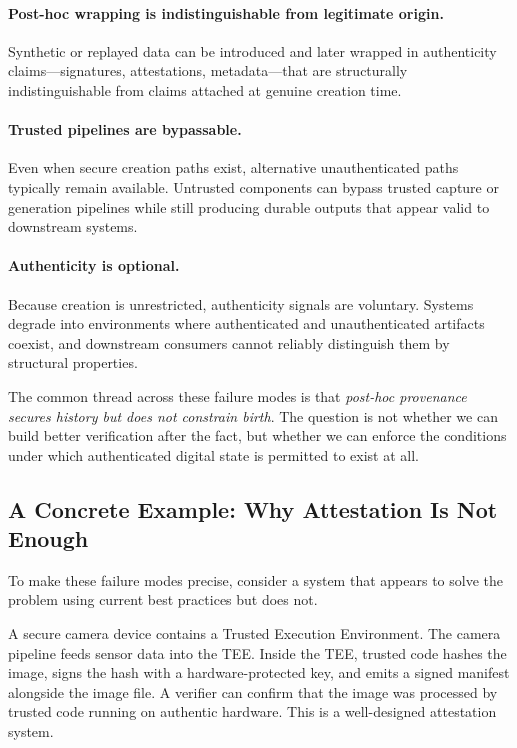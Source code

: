 \documentclass[11pt,letterpaper]{article}
\theoremstyle{occplain}
\theoremstyle{occremark}
\begin{document}
\paragraph{Post-hoc wrapping is indistinguishable from legitimate origin.}
Synthetic or replayed data can be introduced and later wrapped in authenticity claims---signatures, attestations, metadata---that are structurally indistinguishable from claims attached at genuine creation time.

\paragraph{Trusted pipelines are bypassable.}
Even when secure creation paths exist, alternative unauthenticated paths typically remain available. Untrusted components can bypass trusted capture or generation pipelines while still producing durable outputs that appear valid to downstream systems.

\paragraph{Authenticity is optional.}
Because creation is unrestricted, authenticity signals are voluntary. Systems degrade into environments where authenticated and unauthenticated artifacts coexist, and downstream consumers cannot reliably distinguish them by structural properties.

The common thread across these failure modes is that \emph{post-hoc provenance secures history but does not constrain birth}. The question is not whether we can build better verification after the fact, but whether we can enforce the conditions under which authenticated digital state is permitted to exist at all.


\subsection{A Concrete Example: Why Attestation Is Not Enough}
\label{sec:concrete-example}

To make these failure modes precise, consider a system that appears to solve the problem using current best practices but does not.

A secure camera device contains a Trusted Execution Environment. The camera pipeline feeds sensor data into the TEE. Inside the TEE, trusted code hashes the image, signs the hash with a hardware-protected key, and emits a signed manifest alongside the image file. A verifier can confirm that the image was processed by trusted code running on authentic hardware. This is a well-designed attestation system.
\end{document}

